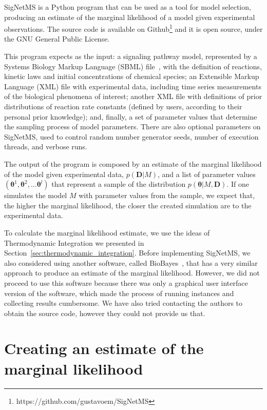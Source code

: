 SigNetMS is a Python program that can be used as a tool for model
selection, producing an estimate of the marginal likelihood of a model
given experimental observations. The source code is available on 
Github\footnote{https://github.com/gustavoem/SigNetMS} and it is open
source, under the GNU General Public License.

This program expects as the input: a signaling pathway model,
represented by a Systems Biology Markup Language
(SBML) file~\cite{hucka2003systems}, with the definition of reactions,
kinetic laws and initial concentrations of chemical species; an
Extensible Markup Language (XML) file with experimental data, including 
time series measurements of the  biological phenomena of interest;
another XML file with definitions of prior distributions of reaction
rate constants (defined by users, according to their personal prior
knowledge); and, finally, a set of parameter values that determine
the sampling process of model parameters. There are also optional
parameters on SigNetMS, used to control random number generator seeds,
number of execution threads, and verbose runs.

The output of the program is composed by an estimate of the marginal
likelihood of the model given experimental data, $p({\bm D} | M)$, and a
list of parameter values $({\bm \theta}^1, {\bm \theta}^2, \ldots {\bm
\theta}^l)$ that represent a sample of the distribution $p({\bm \theta}
| M, {\bm D})$. If one simulates the model $M$ with parameter values
from the sample, we expect that, the higher the marginal likelihood, the
closer the created simulation are to the experimental data.

To calculate the marginal likelihood estimate, we use the ideas of 
Thermodynamic Integration we presented in Section~\ref{sec:thermodynamic_integration}. Before implementing
SigNetMS, we also considered using another software, called
BioBayes~\cite{Vyshemirsky2008}, that has a very similar approach to
produce an estimate of the marginal likelihood. However, we did not
proceed to use this software because there was only a graphical user
interface version of the software, which made the process of running
instances and collecting results cumbersome. We have also tried
contacting the authors to obtain the source code, however they could not
provide us that.

\section{Creating an estimate of the marginal likelihood}
\label{sec:creating_an_estimate_of_the_marginal_likelihood}

